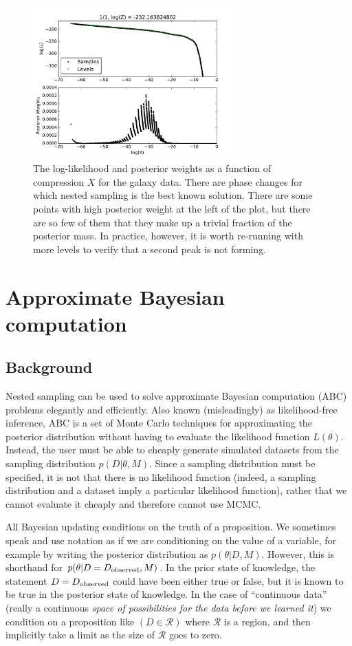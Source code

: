 \documentclass[article]{jss}
\begin{document}
\begin{figure}[t!]
\centering
\includegraphics[width=0.7\textwidth, trim = 0 20 0 25]{galaxies_fig3.pdf}
\caption{The log-likelihood and posterior weights as a function
of compression $X$ for the galaxy data. There are phase changes
\citep{skilling2006nested} for which nested sampling is the best known
solution. There are some points with high posterior weight at the left
of the plot, but there are so few of them that they make up a trivial
fraction of the posterior mass. In practice, however, it is worth
re-running with more levels to verify that a second peak is not forming.
\label{fig:galaxies_fig3}}
\end{figure}


\section{Approximate Bayesian computation}
\subsection{Background}
Nested sampling can be used to solve approximate Bayesian computation (ABC)
problems elegantly and efficiently.
Also known (misleadingly) as likelihood-free inference,
ABC
is a set of Monte Carlo techniques for approximating the posterior distribution
without having to evaluate the likelihood function $L(\theta)$. Instead, 
the user must be able to cheaply
generate simulated datasets from the sampling distribution $p(D|\theta, M)$.
Since a sampling distribution must be specified, it is not that there is
no likelihood function (indeed, a sampling distribution and
a dataset imply a particular likelihood function), rather that we cannot
evaluate it cheaply and therefore cannot use MCMC.

All Bayesian updating conditions on the truth of a proposition. We sometimes
speak and use notation as if we are conditioning on the value of a variable, for
example by writing the posterior distribution as
$p(\theta | D, M)$. However,
this is shorthand for $p(\theta | D = D_{\rm observed}, M)$.
In the prior state of knowledge, the statement
$D = D_{\rm observed}$ could have been either
true or false, but it is known to be true
in the posterior state of knowledge.
In the case of ``continuous data'' (really a continuous {\it space of
possibilities for the data before we learned it}) we condition on a
proposition like $(D \in \mathcal{R})$ where $\mathcal{R}$ is a region, and
then implicitly take a limit as the size of $\mathcal{R}$ goes to zero.
\end{document}
